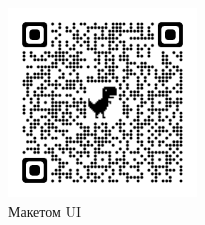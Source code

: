
\begin{figure}
    \includegraphics[width=5cm]{inc/qrcode_www.figma.com.png}
    \caption{Макетом UI}
    \label{fig:qrcode_figma}
\end{figure}
